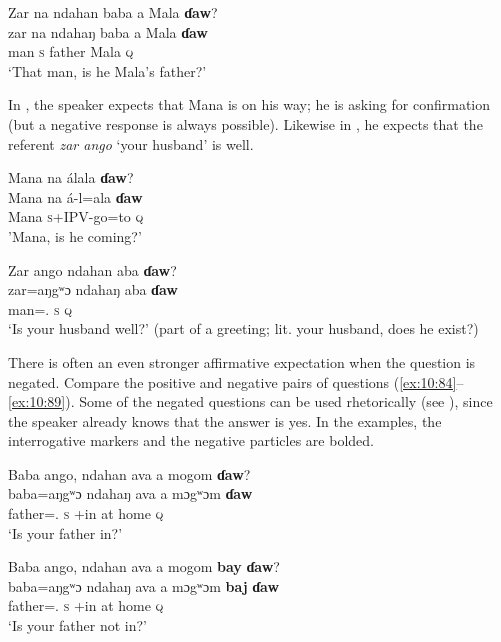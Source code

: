 \ea \label{ex:10:81}
Zar na  ndahan  baba  a  Mala  \textbf{ɗaw}?\\
\gll  zar   na   ndahaŋ   baba   a   Mala   \textbf{ɗaw}\\
      man    {\PSP}  \textsc{s}  father  {\GEN}  Mala  {\textsc{q}}\\
\glt  ‘That man, is he Mala’s father?’
\z

In , the speaker expects that Mana is on his way; he is asking for confirmation (but a negative response is always possible). Likewise in , he expects that the referent \textit{zar ango} ‘your husband’ is well.

\ea \label{ex:10:82}
Mana  na  álala  \textbf{ɗaw}?\\
\gll  Mana   na  á-l=ala    \textbf{ɗaw}\\
      Mana  {\PSP}  \textsc{s}+IPV-go=to  {\textsc{q}}\\
\glt  'Mana, is he coming?'
\z

\clearpage
\ea \label{ex:10:83}
Zar  ango  ndahan  aba  \textbf{ɗaw}?\\
\gll  zar=aŋgʷɔ    ndahaŋ  aba   \textbf{ɗaw}\\
      man={\twoS}.{\POSS}  \textsc{s}  {\EXT}  {\textsc{q}}\\
\glt  ‘Is your husband well?’ (part of a greeting; lit. your husband, does he exist?) 
\z

There is often an even stronger affirmative expectation when the question is negated. Compare the positive and negative pairs of questions (\ref{ex:10:84}–\ref{ex:10:89}). Some of the negated questions can be used rhetorically (see ), since the speaker already knows that the answer is yes. In the examples, the interrogative markers and the negative particles are bolded.

\ea \label{ex:10:84}
Baba  ango,  ndahan  ava  a  mogom  \textbf{ɗaw}?\\
\gll  baba=aŋgʷɔ    ndahaŋ   ava  a  mɔgʷɔm    \textbf{ɗaw}\\
      father={\twoS}.{\POSS}  \textsc{s}    {\EXT}+in  at  home    {\textsc{q}}\\
\glt  ‘Is your father in?’
\z

\ea \label{ex:10:85}
Baba  ango,  ndahan  ava  a  mogom  \textbf{bay}  \textbf{ɗaw}?\\
\gll  baba=aŋgʷɔ    ndahaŋ ava  a  mɔgʷɔm   \textbf{baj}  \textbf{ɗaw}\\
      father={\twoS}.{\POSS}  \textsc{s}    {\EXT}+in  at  home    {\NEG}  {\textsc{q}}\\
\glt  ‘Is your father not in?’
\z

